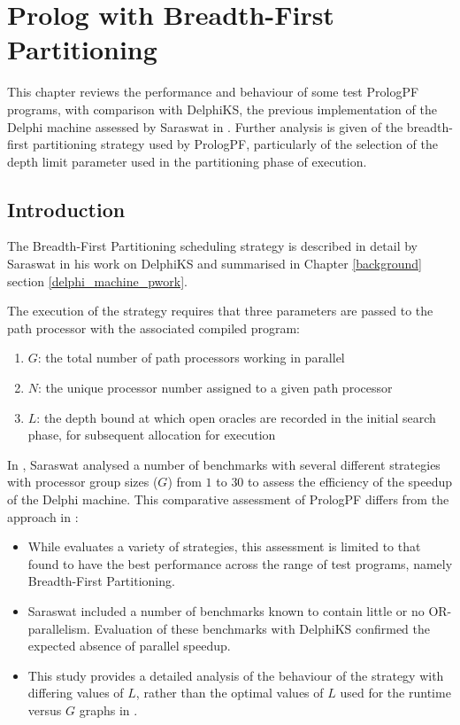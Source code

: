 \chapter{Prolog with Breadth-First Partitioning} 
\label{bfp_depth}

This chapter reviews the performance and behaviour of
some test PrologPF programs, with comparison with DelphiKS, the previous
implementation of the Delphi machine assessed 
by Saraswat in \cite{Sar95}.
Further analysis is given of the breadth-first partitioning strategy used
by PrologPF, particularly of the selection of the depth limit parameter used
in the partitioning phase of execution.

\section{Introduction} %
\enlargethispage{-\baselineskip}   %

The Breadth-First Partitioning scheduling strategy is described in detail by
Saraswat in his work on DelphiKS
\cite{Sar95} and summarised in Chapter \ref{background} section
\ref{delphi_machine_pwork}.

The execution of the strategy requires that three parameters
are passed to the path processor
with the associated compiled program:
\begin{enumerate}
\item{$G$: the total number of path processors working in parallel}
\item{$N$: the unique processor number assigned to a given path processor}
\item{$L$: the depth bound at which open oracles are recorded in the
  initial search phase, for subsequent allocation for execution}
\end{enumerate}

In \cite{Sar95}, Saraswat analysed a number of benchmarks with several different
strategies with processor group sizes ($G$) from $1$ to
$30$ to assess the efficiency of the speedup of the Delphi machine.
This comparative assessment of PrologPF differs from the approach in
\cite{Sar95}:
\begin{itemize}
\item{While \cite{Sar95} evaluates a variety of strategies, this assessment
  is limited to that found to have the best performance across the range of
  test programs, namely Breadth-First Partitioning.}
\item{Saraswat included a number of benchmarks known to contain little or
  no OR-parallelism.  Evaluation of these benchmarks with DelphiKS confirmed
  the expected absence of parallel speedup.}
\item{This study provides a detailed analysis of the behaviour of the strategy
  with differing values of $L$, rather than the optimal values of $L$ used
  for the runtime versus $G$ graphs in \cite{Sar95}.}
\end{itemize}

